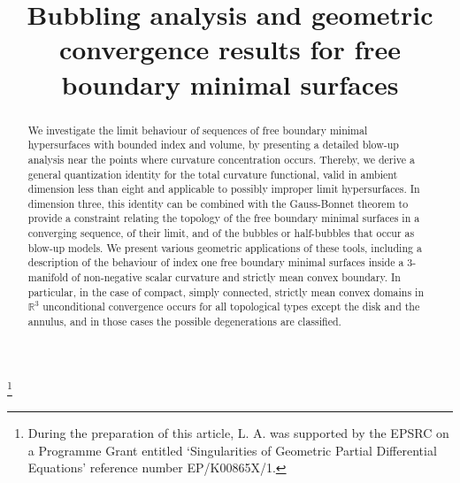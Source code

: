 \documentclass[JEP,XML,SOM,Unicode]{cedram}
\newcounter{cas}
\theoremstyle{definition}
\begin{document}
\frontmatter
\title[Bubbling analysis for free boundary minimal surfaces]{Bubbling analysis and geometric convergence results for free boundary minimal surfaces}

\author[\initial{L.} \lastname{Ambrozio}]{ }
\address{Department of Mathematics, University of Warwick\\
Coventry CV4 7AL, United Kingdom}

\author[\initial{R.} \lastname{Buzano}]{ }
\address{School of Mathematical Sciences, Queen Mary University of London\\
London E1 4NS, United Kingdom}

\author[\initial{A.} \lastname{Carlotto}]{ }
\address{Department of Mathematics, ETH\\
8092 Zürich, Switzerland}

\author[\initial{B.} \lastname{Sharp}]{ }
\address{School of Mathematics, University of Leeds\\
Leeds LS2 9JT, United Kingdom}

\thanks{During the preparation of this article, L. A. was supported by the EPSRC on a Programme Grant entitled `Singularities of Geometric Partial Differential Equations' reference number EP/K00865X/1.}



\begin{abstract}
We investigate the limit behaviour of sequences of free boundary minimal hypersurfaces with bounded index and volume, by presenting a detailed blow-up analysis near the points where curvature concentration occurs. Thereby, we derive a general quantization identity for the total curvature functional, valid in ambient dimension less than eight and applicable to possibly improper limit hypersurfaces. In dimension three, this identity can be combined with the Gauss-Bonnet theorem to provide a constraint relating the topology of the free boundary minimal surfaces in a converging sequence, of their limit, and of the bubbles or half-bubbles that occur as blow-up models. We present various geometric applications of these tools, including a description of the behaviour of index one free boundary minimal surfaces inside a 3-manifold of non-negative scalar curvature and strictly mean convex boundary. In particular, in the case of compact, simply connected, strictly mean convex domains in $\mathbb{R}^3$ unconditional convergence occurs for all topological types except the disk and the annulus, and in those cases the possible degenerations are classified.
\end{abstract}
\end{document}
